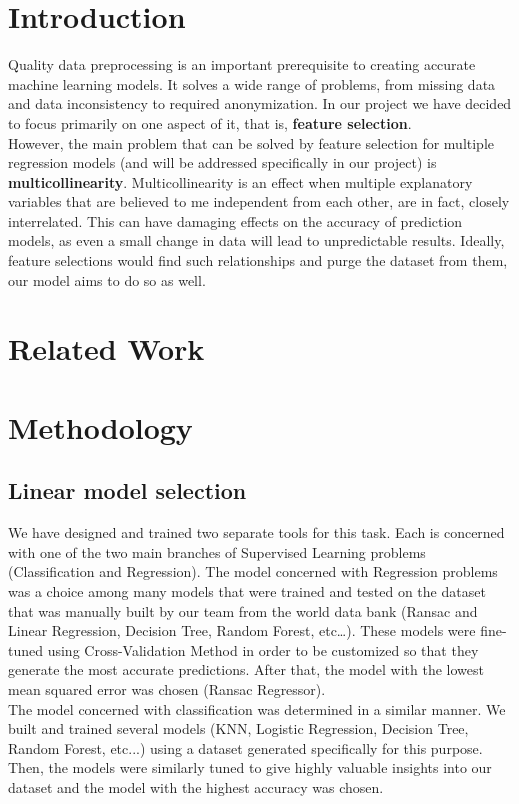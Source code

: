 \section{Introduction}
Quality data preprocessing is an important prerequisite to creating accurate machine learning models. It solves a wide range of problems, from missing data and data inconsistency to required anonymization. In our project we have decided to focus primarily on one aspect of it, that is, \textbf{feature selection}. \\

However, the main problem that can be solved by feature selection for multiple regression models (and will be addressed specifically in our project) is \textbf{multicollinearity}. Multicollinearity is an effect when multiple explanatory variables that are believed to me independent from each other, are in fact, closely interrelated. This can have damaging effects on the accuracy of prediction models, as even a small change in data will lead to unpredictable results. Ideally, feature selections would find such relationships and purge the dataset from them, our model aims to do so as well.\\
\section{Related Work}




\section{Methodology}
\subsection{Linear model selection}
We have designed and trained two separate tools for this task. Each is concerned with one of the two main branches of Supervised Learning problems (Classification and Regression).
The model concerned with Regression problems was a choice among many models that were trained and tested on the dataset that was manually built by our team from the world data bank (Ransac and Linear Regression, Decision Tree, Random Forest, etc…). These models were fine-tuned using Cross-Validation Method in order to be customized so that they generate the most accurate predictions. After that, the model with the lowest mean squared error was chosen (Ransac Regressor).\\

The model concerned with classification was determined in a similar manner. We built and trained several models (KNN, Logistic Regression, Decision Tree, Random Forest, etc...) using a dataset generated specifically for this purpose. Then, the models were similarly tuned to give highly valuable insights into our dataset and the model with the highest accuracy was chosen.
